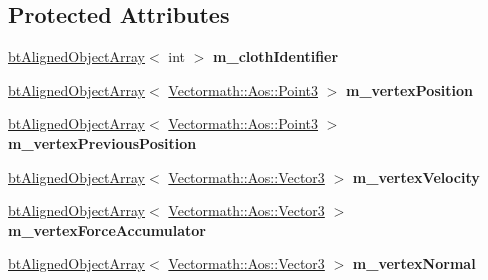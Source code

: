 \subsection*{Protected Attributes}
\begin{DoxyCompactItemize}
\item 
\mbox{\label{classbtSoftBodyVertexData_a82dffaecbdf2212e4271ec67c4721ff5}} 
\hyperlink{classbtAlignedObjectArray}{bt\+Aligned\+Object\+Array}$<$ int $>$ {\bfseries m\+\_\+cloth\+Identifier}
\item 
\mbox{\label{classbtSoftBodyVertexData_a58ba4336122fb9c9637a086eb8baa463}} 
\hyperlink{classbtAlignedObjectArray}{bt\+Aligned\+Object\+Array}$<$ \hyperlink{classVectormath_1_1Aos_1_1Point3}{Vectormath\+::\+Aos\+::\+Point3} $>$ {\bfseries m\+\_\+vertex\+Position}
\item 
\mbox{\label{classbtSoftBodyVertexData_a4dde01d320da9b2a5403acce90e64bd0}} 
\hyperlink{classbtAlignedObjectArray}{bt\+Aligned\+Object\+Array}$<$ \hyperlink{classVectormath_1_1Aos_1_1Point3}{Vectormath\+::\+Aos\+::\+Point3} $>$ {\bfseries m\+\_\+vertex\+Previous\+Position}
\item 
\mbox{\label{classbtSoftBodyVertexData_ab56e3245c46292bf4621f6316f17e613}} 
\hyperlink{classbtAlignedObjectArray}{bt\+Aligned\+Object\+Array}$<$ \hyperlink{classVectormath_1_1Aos_1_1Vector3}{Vectormath\+::\+Aos\+::\+Vector3} $>$ {\bfseries m\+\_\+vertex\+Velocity}
\item 
\mbox{\label{classbtSoftBodyVertexData_af1e647e767e9bc9c33a472db531bf494}} 
\hyperlink{classbtAlignedObjectArray}{bt\+Aligned\+Object\+Array}$<$ \hyperlink{classVectormath_1_1Aos_1_1Vector3}{Vectormath\+::\+Aos\+::\+Vector3} $>$ {\bfseries m\+\_\+vertex\+Force\+Accumulator}
\item 
\mbox{\label{classbtSoftBodyVertexData_af9ab6e325ae1068aa14a97167499c6da}} 
\hyperlink{classbtAlignedObjectArray}{bt\+Aligned\+Object\+Array}$<$ \hyperlink{classVectormath_1_1Aos_1_1Vector3}{Vectormath\+::\+Aos\+::\+Vector3} $>$ {\bfseries m\+\_\+vertex\+Normal}
\item 
\mbox{\label{classbtSoftBodyVertexData_a03c80a45362f91cc486ef9e001a9be70}} 

\end{DoxyCompactItemize}
